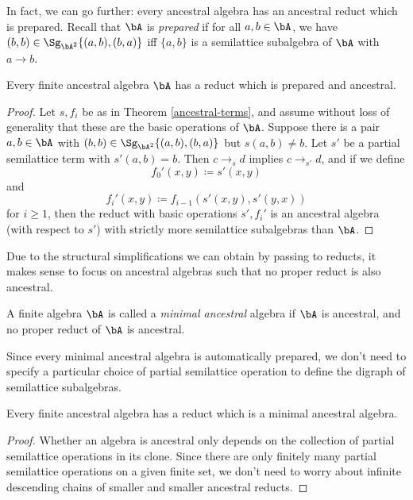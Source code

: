 In fact, we can go further: every ancestral algebra has an ancestral reduct which is prepared. Recall that $\bA$ is \emph{prepared} if for all $a,b \in \bA$, we have $(b,b) \in \Sg_{\bA^2}\{(a,b),(b,a)\}$ iff $\{a,b\}$ is a semilattice subalgebra of $\bA$ with $a \rightarrow b$.%

\begin{thm} Every finite ancestral algebra $\bA$ has a reduct which is prepared and ancestral.
\end{thm}
\begin{proof} Let $s, f_i$ be as in Theorem \ref{ancestral-terms}, and assume without loss of generality that these are the basic operations of $\bA$. Suppose there is a pair $a,b \in \bA$ with $(b,b) \in \Sg_{\bA^2}\{(a,b),(b,a)\}$ but $s(a,b) \ne b$. Let $s'$ be a partial semilattice term with $s'(a,b) = b$. Then $c \rightarrow_{s} d$ implies $c \rightarrow_{s'} d$, and if we define
\[
f_0'(x,y) \coloneqq s'(x,y)
\]
and
\[
f_i'(x,y) \coloneqq f_{i-1}(s'(x,y),s'(y,x))
\]
for $i \ge 1$, then the reduct with basic operations $s', f_i'$ is an ancestral algebra (with respect to $s'$) with strictly more semilattice subalgebras than $\bA$.
\end{proof}

Due to the structural simplifications we can obtain by passing to reducts, it makes sense to focus on ancestral algebras such that no proper reduct is also ancestral.

\begin{defn} A finite algebra $\bA$ is called a \emph{minimal ancestral} algebra if $\bA$ is ancestral, and no proper reduct of $\bA$ is ancestral.
\end{defn}

Since every minimal ancestral algebra is automatically prepared, we don't need to specify a particular choice of partial semilattice operation to define the digraph of semilattice subalgebras.

\begin{prop} Every finite ancestral algebra has a reduct which is a minimal ancestral algebra.
\end{prop}
\begin{proof} Whether an algebra is ancestral only depends on the collection of partial semilattice operations in its clone. Since there are only finitely many partial semilattice operations on a given finite set, we don't need to worry about infinite descending chains of smaller and smaller ancestral reducts.
\end{proof}

